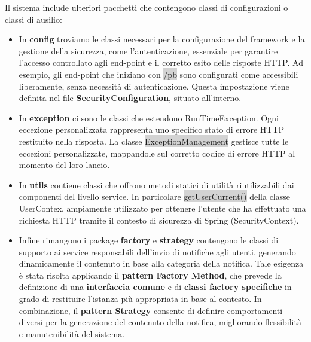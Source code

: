 
Il sistema include ulteriori pacchetti che contengono classi di configurazioni o classi di ausilio: 

\begin{itemize}
	
	\item In \textbf{config} troviamo le classi necessari per la configurazione del framework e la gestione della sicurezza, come l’autenticazione, essenziale per garantire l’accesso controllato agli end-point e il corretto esito delle risposte
	HTTP. Ad esempio, gli end-point che iniziano con \colorbox{lightgray}{/pb} sono configurati come accessibili liberamente, senza necessità di autenticazione. Questa impostazione viene definita nel file \textbf{SecurityConfiguration}, situato all’interno.
	
	\item In \textbf{exception} ci sono le classi che estendono RunTimeException.
	Ogni eccezione personalizzata rappresenta uno specifico stato di errore HTTP restituito nella risposta. La classe \colorbox{lightgray}{ExceptionManagement} gestisce tutte le eccezioni personalizzate, mappandole sul corretto codice di errore HTTP al momento del loro lancio.
	
	\item In \textbf{utils} contiene classi che offrono metodi statici di utilità riutilizzabili dai componenti del livello service. 
	In particolare \colorbox{lightgray}{getUserCurrent()} della classe UserContex, ampiamente utilizzato per ottenere l’utente che ha effettuato una richiesta HTTP tramite il contesto di sicurezza di Spring (SecurityContext).
	
	\item Infine rimangono i package \textbf{factory} e \textbf{strategy} contengono le classi di supporto ai service responsabili dell’invio di notifiche agli utenti, generando dinamicamente il contenuto in base alla categoria della notifica. Tale esigenza è stata risolta applicando il \textbf{pattern Factory Method}, che prevede la definizione di una \textbf{interfaccia comune} e di \textbf{classi factory specifiche} in grado di restituire l’istanza più appropriata in base al contesto.
	In combinazione, il \textbf{pattern Strategy} consente di definire comportamenti diversi per la generazione del contenuto della notifica, migliorando flessibilità e manutenibilità del sistema.
	
\end{itemize}
 
